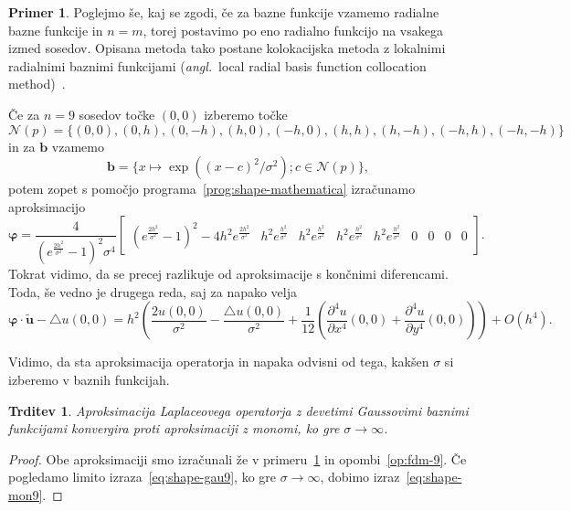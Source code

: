 \documentclass[12pt,a4paper,twoside]{article}
\theoremstyle{definition} %
\newtheorem{primer}[definicija]{Primer}
\theoremstyle{plain} %
\newtheorem{trditev}[definicija]{Trditev}
\numberwithin{equation}{section}
\newcommand{\Nc}{\mathcal{N}}
\newcommand{\lap}{\triangle}
\renewcommand{\b}{\boldsymbol}
\renewcommand{\phi}{\varphi}
\newcommand{\dpar}[2]{\ensuremath{\frac{\partial #1}{\partial #2}}}
\newcommand{\ang}[1]{(\textit{angl.}\ #1)}
\begin{document}
\begin{primer}
\label{prim:rbf}
Poglejmo še, kaj se zgodi, če za bazne funkcije vzamemo radialne bazne funkcije in $n = m$, torej
postavimo po eno radialno funkcijo na vsakega izmed sosedov. Opisana metoda tako postane
kolokacijska metoda z lokalnimi radialnimi baznimi funkcijami \ang{local radial basis function
collocation method}~\cite{kosec2011h}.

Če za $n = 9$ sosedov točke $(0, 0)$ izberemo točke
\small
\begin{equation}
  \Nc(p) = \{  (0, 0), (0, h), (0, -h), (h, 0), (-h, 0), (h, h), (h, -h), (-h, h), (-h, -h)\}
\end{equation}
\normalsize
in za $\b b$ vzamemo
\begin{equation}
  \b b = \{ x\mapsto \exp((x-c)^2/\sigma^2); c \in \Nc(p)\},
\end{equation}
potem zopet s
pomočjo programa~\ref{prog:shape-mathematica} izračunamo aproksimacijo
\small
\begin{equation}
  \b\phi =\frac{4}{(e^{\frac{2 h^2}{\sigma^2 }}-1)^2 \sigma^4}
\begin{bmatrix}
  (e^{\frac{2 h^2}{\sigma^2 }}-1)^2 -4h^2 e^{\frac{2 h^2}{\sigma^2 }} &
   h^2e^{\frac{h^2}{\sigma^2 }} & h^2e^{\frac{h^2}{\sigma^2 }} &
   h^2e^{\frac{h^2}{\sigma^2 }} & h^2e^{\frac{h^2}{\sigma^2 }} & 0 & 0 & 0 & 0
 \end{bmatrix}.
  \label{eq:shape-gau9}
\end{equation}
\normalsize
Tokrat vidimo, da se precej razlikuje od aproksimacije s končnimi diferencami.
Toda, še vedno je drugega reda, saj za napako velja
\small
\begin{equation}
  \b \phi\cdot \b{\tilde{u}} - \lap u(0, 0) =
  h^2\left(\frac{2u(0, 0)}{\sigma^2} - \frac{\lap u(0, 0)}{\sigma^2} +
  \frac{1}{12}\left( \dpar{^4u}{x^4}(0, 0) + \dpar{^4u}{y^4}(0, 0) \right)\right)
  + O(h^4).
\end{equation}
\normalsize
\end{primer}

Vidimo, da sta aproksimacija operatorja in napaka odvisni od tega, kakšen
$\sigma$ si izberemo v baznih funkcijah.
\begin{trditev}
  \label{trd:rbf-konv-k-mon}
  Aproksimacija Laplaceovega operatorja z devetimi Gaussovimi baznimi funkcijami
  konvergira proti aproksimaciji z monomi, ko gre $\sigma \to \infty$.
\end{trditev}
\begin{proof}
  Obe aproksimaciji smo izračunali že v primeru~\ref{prim:rbf} in
  opombi~\ref{op:fdm-9}. Če pogledamo limito izraza~\eqref{eq:shape-gau9},
  ko gre $\sigma \to \infty$, dobimo izraz~\eqref{eq:shape-mon9}.
\end{proof}
\end{document}

